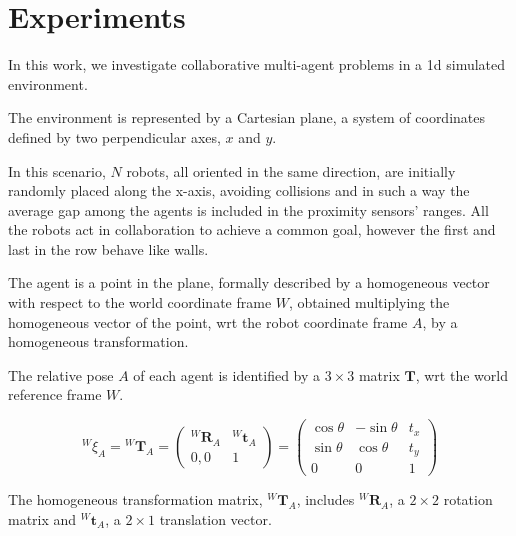\chapter{Experiments}
\label{chap:experiments}


In this work, we investigate collaborative multi-agent problems in a \gls{1d} 
simulated environment.

The environment is represented by a Cartesian plane, a system of coordinates
defined by two perpendicular axes, $x$ and $y$. 

In this scenario, $N$ robots, all oriented in the same direction, are initially 
randomly placed along the x-axis, avoiding collisions and in such a way the 
average gap among the agents is included in the proximity sensors' ranges. 
All the robots act in collaboration to achieve a common goal, however the first 
and last in the row behave like walls. %

The agent is a point in the plane, formally described by a homogeneous vector 
with respect to the world coordinate frame $W$, obtained multiplying the 
homogeneous vector of the point, \gls{wrt}  the robot coordinate frame 
$A$, by a homogeneous transformation. 

The relative pose $A$ of each agent is identified by a $3 \times 3$ matrix 
$\mathbf{T}$, \gls{wrt} the world reference frame $W$. 

\begin{Equation}[!htb]
	\centering
	\begin{equation}
	{^W\!\xi_A} = {^W\!\mathbf{T}_A} 
	=
	\begin{pmatrix}
	^W\!\mathbf{R}_A & ^W\!\mathbf{t}_A\\
	0, 0 & 1
	\end{pmatrix}
	=
	\begin{pmatrix}
	\cos \theta & - \sin \theta & t_x\\
	\sin \theta & \cos \theta & t_y\\
	0 & 0 & 1
	\end{pmatrix}
	\end{equation}
	\caption[Homogeneous transformation matrix.]{The homogeneous 
	transformation matrix, 	$^W\!\mathbf{T}_A$, includes $^W\!\mathbf{R}_A$, a 
	$2 \times 2$ rotation matrix and $^W\!\mathbf{t}_A$, a $2 \times 1$ 
	translation vector.}
	\label{eq:hommatrix}
\end{Equation}

